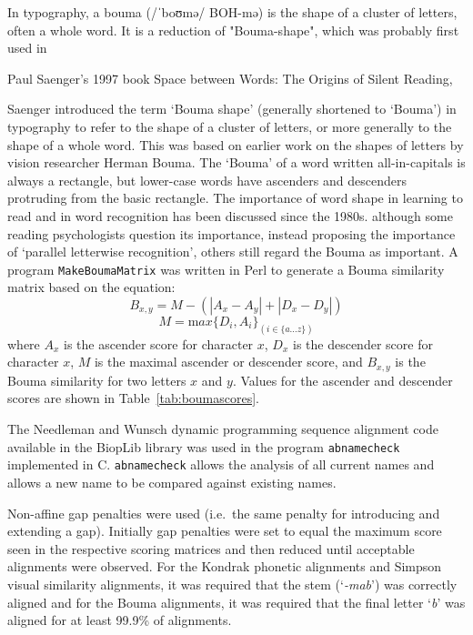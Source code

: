 \documentclass{article}
\newcommand{\eg}[1]{`\emph{#1}'}
\begin{document}
In typography, a bouma (/ˈboʊmə/ BOH-mə) is the shape of a cluster of
letters, often a whole word. It is a reduction of "Bouma-shape", which
was probably first used in

Paul Saenger's 1997 book Space between
Words: The Origins of Silent Reading,

Saenger\cite{saenger:bouma} introduced the term `Bouma shape'
(generally shortened to `Bouma') in typography to refer to the shape
of a cluster of letters, or more generally to the shape of a whole
word. This was based on earlier work on the shapes of letters by
vision researcher Herman Bouma\cite{bouma:isolated,bouma:initial}.
The `Bouma' of a word written all-in-capitals is always a rectangle,
but lower-case words have ascenders and descenders protruding from the
basic rectangle. The importance of word shape in learning to read and
in word recognition has been discussed since the 1980s\cite[for
  example]{haber:wordshape}. although some reading psychologists
question its importance, instead proposing the importance of `parallel
letterwise
recognition'\cite{rayner:span,paap:wordshape,larson:wordrecognition},
others still regard the Bouma as important\cite{glezer:bouma}.  A
program \verb|MakeBoumaMatrix| was written in Perl to generate a Bouma
similarity matrix based on the equation:
\begin{equation}
  B_{x,y} = M - (|A_x - A_y| + |D_x - D_y|)
\end{equation}
\begin{equation}
  M={\mathrm max}\{D_i, A_i\}_{(i\in \{a\ldots z\})}
\end{equation}
where $A_x$ is the ascender score for character $x$, $D_x$ is the
descender score for character $x$, $M$ is the maximal ascender or
descender score, and $B_{x,y}$ is the Bouma similarity for two letters
$x$ and $y$. Values for the ascender and descender scores are shown in
Table~\ref{tab:boumascores}.

The Needleman and Wunsch dynamic programming sequence alignment code
available in the BiopLib\cite{porter:bioplib} library was used in the
program \verb|abnamecheck| implemented in C. \verb|abnamecheck| allows
the analysis of all current names and allows a new name to be compared
against existing names.

Non-affine gap penalties were used (i.e.\ the same penalty for
introducing and extending a gap). Initially gap penalties were set to
equal the maximum score seen in the respective scoring matrices and
then reduced until acceptable alignments were observed. For the
Kondrak phonetic alignments and Simpson visual similarity alignments,
it was required that the stem (\eg{-mab}) was correctly aligned and
for the Bouma alignments, it was required that the final letter \eg{b}
was aligned for at least 99.9\% of alignments.
\end{document}
